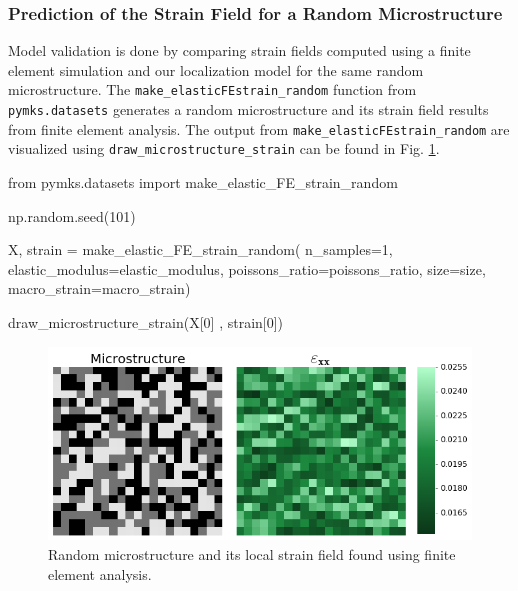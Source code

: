 \documentclass{bmcart}
\newcommand{\fimage}
{\fcolorbox{outcolor}{white}}
{}
\begin{document}
    \subsubsection{Prediction of the Strain Field for a Random
Microstructure}\label{prediction-of-the-strain-field-for-a-random-microstructure}

Model validation is done by comparing strain fields computed using a
finite element simulation and our localization model for the same random
microstructure. The \texttt{make\_elasticFEstrain\_random} function from
\texttt{pymks.datasets} generates a random microstructure and its
strain field results from finite element analysis. The output from
\texttt{make\_elasticFEstrain\_random} are visualized using 
\texttt{draw\_microstructure\_strain} can be found in Fig.
\ref{fig:drawMicroStrainRandom}.


\begin{_input}
from pymks.datasets import make_elastic_FE_strain_random

np.random.seed(101)

X, strain = make_elastic_FE_strain_random(
    n_samples=1, elastic_modulus=elastic_modulus,
    poissons_ratio=poissons_ratio, size=size,
    macro_strain=macro_strain)

draw_microstructure_strain(X[0] , strain[0])

\end{_input}


\begin{figure}
    \centering
    \includegraphics[scale=.54]{pymks_paper_localization_files/pymks_paper_localization_12_0.png}
    \caption{Random microstructure and its local strain field found using finite element analysis.}
    \label{fig:drawMicroStrainRandom}
\end{figure}
\end{document}
